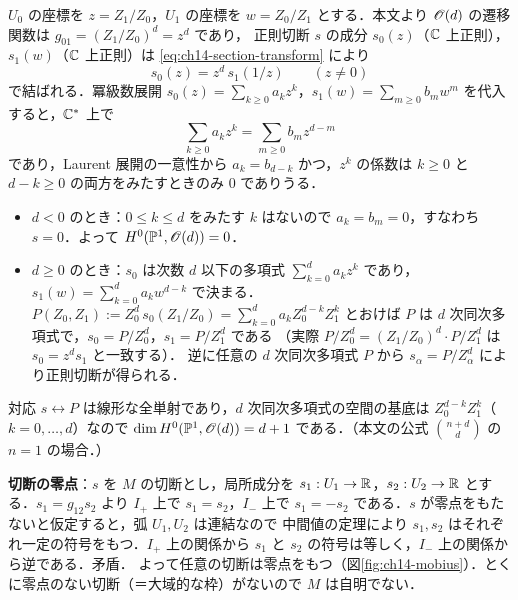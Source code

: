 $U_0$ の座標を $z=Z_1/Z_0$，$U_1$ の座標を $w=Z_0/Z_1$ とする．本文より $\mathscr{O}(d)$ の遷移関数は $g_{01}=(Z_1/Z_0)^d=z^d$ であり，
正則切断 $s$ の成分 $s_0(z)$（$\mathbb{C}$ 上正則），$s_1(w)$（$\mathbb{C}$ 上正則）は \eqref{eq:ch14-section-transform} により
\begin{equation*}
  s_0(z) = z^d\,s_1(1/z)\qquad(z\neq0)
\end{equation*}
で結ばれる．冪級数展開 $s_0(z)=\sum_{k\geq0}a_kz^k$，$s_1(w)=\sum_{m\geq0}b_mw^m$ を代入すると，$\mathbb{C}^*$ 上で
\begin{equation*}
  \sum_{k\geq0}a_kz^k = \sum_{m\geq0}b_mz^{d-m}
\end{equation*}
であり，Laurent 展開の一意性から $a_k=b_{d-k}$ かつ，$z^k$ の係数は $k\geq0$ と $d-k\geq0$ の両方をみたすときのみ $0$ でありうる．
\begin{itemize}
  \item $d<0$ のとき：$0\leq k\leq d$ をみたす $k$ はないので $a_k=b_m=0$，すなわち $s=0$．よって $H^0(\mathbb{P}^1,\mathscr{O}(d))=0$．
  \item $d\geq0$ のとき：$s_0$ は次数 $d$ 以下の多項式 $\sum_{k=0}^da_kz^k$ であり，$s_1(w)=\sum_{k=0}^d a_kw^{d-k}$ で決まる．
  $P(Z_0,Z_1):=Z_0^d\,s_0(Z_1/Z_0)=\sum_{k=0}^da_kZ_0^{d-k}Z_1^k$ とおけば $P$ は $d$ 次同次多項式で，$s_0=P/Z_0^d$，$s_1=P/Z_1^d$ である
  （実際 $P/Z_0^d = (Z_1/Z_0)^d\cdot P/Z_1^d$ は $s_0=z^ds_1$ と一致する）．
  逆に任意の $d$ 次同次多項式 $P$ から $s_\alpha=P/Z_\alpha^d$ により正則切断が得られる．
\end{itemize}
対応 $s\leftrightarrow P$ は線形な全単射であり，$d$ 次同次多項式の空間の基底は $Z_0^{d-k}Z_1^k$（$k=0,\dots,d$）なので
$\dim H^0(\mathbb{P}^1,\mathscr{O}(d))=d+1$ である．（本文の公式 $\binom{n+d}{d}$ の $n=1$ の場合．）

\textbf{切断の零点}：$s$ を $M$ の切断とし，局所成分を $s_1:U_1\to\mathbb{R}$，$s_2:U_2\to\mathbb{R}$ とする．$s_1=g_{12}s_2$ より
$I_+$ 上で $s_1=s_2$，$I_-$ 上で $s_1=-s_2$ である．$s$ が零点をもたないと仮定すると，弧 $U_1,U_2$ は連結なので
中間値の定理により $s_1,s_2$ はそれぞれ一定の符号をもつ．$I_+$ 上の関係から $s_1$ と $s_2$ の符号は等しく，$I_-$ 上の関係から逆である．矛盾．
よって任意の切断は零点をもつ（図\ref{fig:ch14-mobius}）．とくに零点のない切断（＝大域的な枠）がないので $M$ は自明でない．

